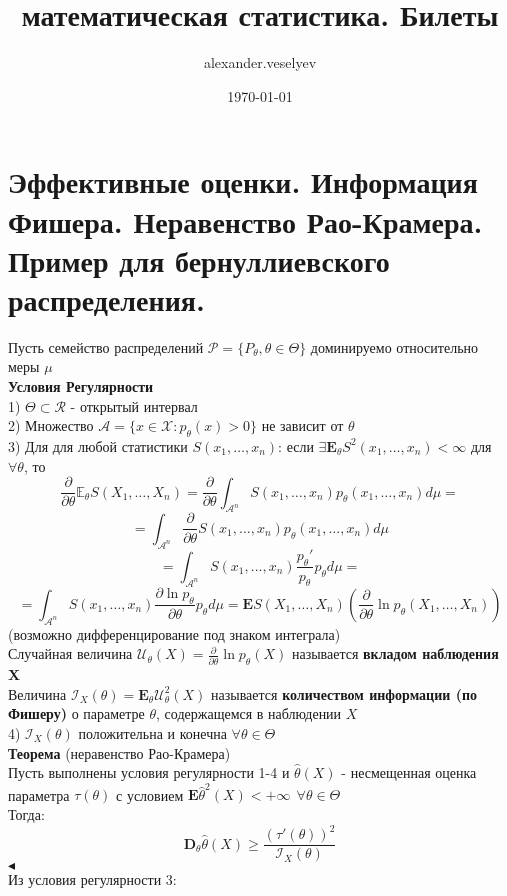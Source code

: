 \documentclass{article}
\title{математическая статистика. Билеты}
\author{alexander.veselyev }
\date{\today}
\begin{document}
\section{Эффективные оценки. Информация Фишера. Неравенство Рао-Крамера. Пример
для бернуллиевского распределения.}

Пусть семейство распределений $\mathcal{P} = \{P_\theta, \theta \in \Theta \}$ доминируемо относительно меры $\mu$\\
\textbf{Условия Регулярности}\\
1) $\Theta \subset \mathcal{R}$ - открытый интервал\\
2) Множество $\mathcal{A} = \{x\in\mathcal{X}:p_\theta(x)>0\}$ не зависит от $\theta$\\
3) Для для любой статистики $S(x_1,\dots,x_n)$: если $\exists \mathbf{E}_\theta S^2(x_1,\dots,x_n) < \infty$ для $\forall \theta$, то
$$ \frac{\partial}{\partial\theta}\mathbb{E}_\theta S(X_1,\dots,X_n) = \frac{\partial}{\partial\theta}\int_{\mathcal{A}^n}{S(x_1,\dots,x_n)p_\theta(x_1,\dots,x_n)d\mu} =$$ $$= \int_{\mathcal{A}^n}{\frac{\partial}{\partial\theta}S(x_1,\dots,x_n)p_\theta(x_1,\dots,x_n)d\mu}$$
$$= \int_{\mathcal{A}^n}{S(x_1,\dots,x_n)\frac{p_\theta'}{p_\theta}p_\theta d\mu} = $$ $$= \int_{\mathcal{A}^n}{S(x_1,\dots,x_n)\frac{\partial \ln{p_\theta}}{\partial\theta}p_\theta d\mu} =
\mathbf{E}S(X_1,\dots,X_n)\left(\frac{\partial}{\partial\theta}\ln{p_\theta(X_1,\dots,X_n)}\right)
$$
(возможно дифференцирование под знаком интеграла)\\
Случайная величина $\mathcal{U}_\theta(X) = \frac{\partial}{\partial\theta}\ln{p_\theta(X)}$ называется \textbf{вкладом наблюдения X}\\
Величина $\mathcal{I}_X(\theta) = \mathbf{E}_\theta\mathcal{U}_\theta^2(X)$ называется \textbf{количеством информации (по Фишеру)} о параметре $\theta$, содержащемся в наблюдении $X$\\
4) $\mathcal{I}_X(\theta)$ положительна и конечна $\forall \theta\in\Theta$\\
\textbf{Теорема} (неравенство Рао-Крамера)\\
Пусть выполнены условия регулярности 1-4 и $\widehat{\theta}(X)$ - несмещенная оценка параметра $\tau(\theta)$ с условием $\mathbf{E}\widehat{\theta}^2(X) < +\infty\ \ \forall\theta\in\Theta$\\
Тогда:
$$\mathbf{D}_\theta\widehat{\theta}(X) \geq \frac{(\tau'(\theta))^2}{\mathcal{I}_X(\theta)} $$
$\blacktriangleleft$
\\
Из условия регулярности 3:\\
\end{document}
